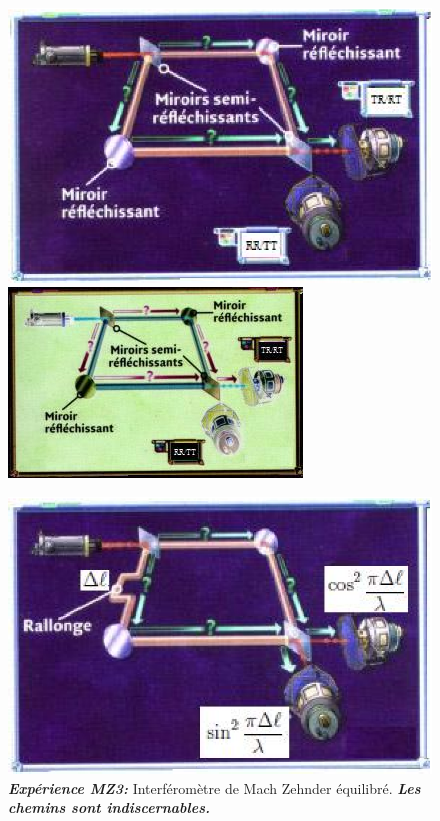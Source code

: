 \begin{figure}[ptbh]
\begin{minipage}[c]{.48\linewidth}
\centering
\ifcase\msipdfoutput
	\includegraphics[scale=1]{graphics/MZ3.eps}%
\else
	\includegraphics[scale=1]{graphics/MZ3.jpg}%
\fi
\caption{\emph{\textbf{Expérience MZ3:}} Interféromètre de Mach Zehnder
équilibré. \emph{\textbf{Les
chemins sont indiscernables.}}}
\label{fig:MZ3}%
\end{minipage} \hfill\begin{minipage}[c]{.48\linewidth}
\centering
\ifcase\msipdfoutput
	\includegraphics[scale=1]{graphics/MZ4.eps}%

\end{minipage}
\end{figure}
